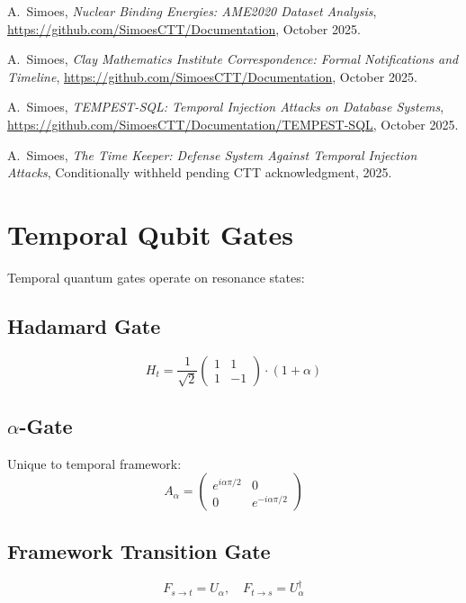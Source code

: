 \documentclass[12pt,a4paper]{article}
\begin{document}
\begin{thebibliography}{9}
A.~Simoes,
\textit{Nuclear Binding Energies: AME2020 Dataset Analysis},
\url{https://github.com/SimoesCTT/Documentation}, October 2025.

A.~Simoes,
\textit{Clay Mathematics Institute Correspondence: Formal Notifications and Timeline},
\url{https://github.com/SimoesCTT/Documentation}, October 2025.

A.~Simoes,
\textit{TEMPEST-SQL: Temporal Injection Attacks on Database Systems},
\url{https://github.com/SimoesCTT/Documentation/TEMPEST-SQL}, October 2025.

A.~Simoes,
\textit{The Time Keeper: Defense System Against Temporal Injection Attacks},
Conditionally withheld pending CTT acknowledgment, 2025.

\end{thebibliography}

\appendix

\section{Temporal Qubit Gates}

Temporal quantum gates operate on resonance states:

\subsection{Hadamard Gate}
\begin{equation}
H_t = \frac{1}{\sqrt{2}} \begin{pmatrix} 1 & 1 \\ 1 & -1 \end{pmatrix} \cdot (1 + \alpha)
\end{equation}

\subsection{$\alpha$-Gate}
Unique to temporal framework:
\begin{equation}
A_\alpha = \begin{pmatrix} e^{i\alpha\pi/2} & 0 \\ 0 & e^{-i\alpha\pi/2} \end{pmatrix}
\end{equation}

\subsection{Framework Transition Gate}
\begin{equation}
F_{s\to t} = U_\alpha, \quad F_{t\to s} = U_\alpha^\dagger
\end{equation}
\end{document}
